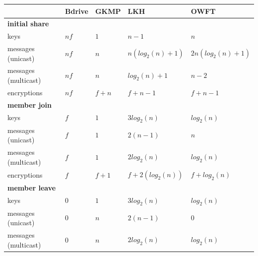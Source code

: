\begin{table}[!ht]
\centering
\begin{tabular}{l 		| l 						| l 							| l 						| l 						}
 						& \textbf{Bdrive} & \textbf{\ac{GKMP}} \cite{harney1997group} & \textbf{\ac{LKH}} \cite{wallner1999key} & \textbf{\ac{OWFT}} \cite{sherman2003key} \\%
\hline
\textbf{initial share} 																																		\\
keys 					& $nf$	 					& $1$  							& $n-1$  					& $n$	 					\\%
messages (unicast)		& $nf$	  					& $n$ 							& $n(log_2(n) + 1)$ 		& $2n(log_2(n) + 1)$		\\%
messages (multicast) 	& $nf$	 					& $n$ 							& $log_2(n) + 1$ 			& $n - 2$ 					\\%
encryptions				& $nf$	 					& $f + n$ 						& $f + n -1$				& $f + n -1$				\\%
\hline
\textbf{member join} 																																		\\
keys 					& $f$   					& $1$  							& $3 log_2(n)$				& $log_2(n)$				\\ %
messages (unicast)		& $f$  						& $1$			 				& $2(n - 1)$				& $n$  						\\ %
messages (multicast) 	& $f$ 	 					& $1$ 		 					& $2 log_2(n)$				& $log_2(n)$				\\ %
encryptions				& $f$  						& $f + 1$		 				& $f + 2(log_2(n))$ 		& $f + log_2(n)$			\\ %
\hline
\textbf{member leave}																																		\\
keys 					& $0$						& $1$			  				& $3 log_2(n)$				& $log_2(n)$				\\ %
messages (unicast)		& $0$						& $n$			 				& $2(n - 1)$ 				& $0$	  					\\ %
messages (multicast)	& $0$						& $n$			 				& $2 log_2(n)$				& $log_2(n)$				\\ %

\end{tabular}
\end{table}
